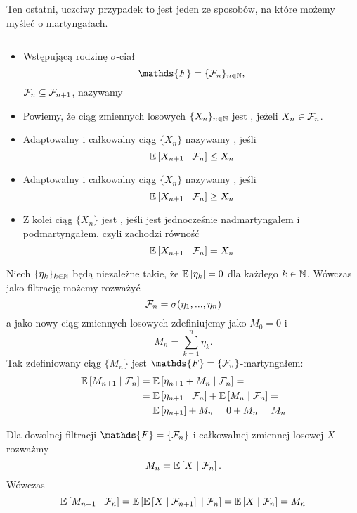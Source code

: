 Ten ostatni, uczciwy przypadek to jest jeden ze sposobów, na które możemy myśleć o martyngałach.

\begin{definition}$ $

  \begin{itemize}
    \item Wstępującą rodzinę $\sigma$-ciał
      $$\mathds{F}=\{\set{F}_n\}_{n\in\N},$$
      $\mathcal{F}_n\subseteq \mathcal{F}_{n+1}$, nazywamy 
    \item Powiemy, że ciąg zmiennych losowych $\{X_n\}_{n\in\operatorname{\mathbb{N}}}$ jest , jeżeli $X_n\in\mathcal{F}_n$.
    \item Adaptowalny i całkowalny ciąg $\{X_n\}$ nazywamy , jeśli
      $$\expected{X_{n+1}}{\set{F}_n}\leq X_n$$
    \item Adaptowalny i całkowalny ciąg $\{X_n\}$ nazywamy , jeśli
      $$\expected{X_{n+1}}{\set{F}_n}\geq X_n$$
    \item Z kolei ciąg $\{X_n\}$ jest , jeśli jest jednocześnie nadmartyngałem i podmartyngałem, czyli zachodzi równość
      $$\expected{X_{n+1}}{\set{F}_n}= X_n$$
  \end{itemize}
\end{definition}

\begin{example}
\item Niech $\{\eta_k\}_{k\in\operatorname{\mathbb{N}}}$ będą niezależne takie, że $\expected{\eta_k}=0$ dla każdego $k\in\operatorname{\mathbb{N}}$. Wówczas jako filtrację możemy rozważyć
  $$\mathcal{F}_n=\sigma(\eta_1,...,\eta_n)$$
  a jako nowy ciąg zmiennych losowych zdefiniujemy jako $M_0=0$ i 
  $$M_n=\sum_{k=1}^n\eta_k.$$
  Tak zdefiniowany ciąg $\{M_n\}$ jest $\mathds{F}=\{\set{F}_n\}$-martyngałem:
  \begin{align*}
    \expected{M_{n+1}}{\set{F}_n}&=\expected{\eta_{n+1}+M_n}{\set{F}_n}=\\
                                 &=\expected{\eta_{n+1}}{\set{F}_n}+\expected{M_n}{\set{F}_n}=\\
                                 &=\expected{\eta_{n+1}}+M_n=0+M_n=M_n
  \end{align*}
\item Dla dowolnej filtracji $\mathds{F}=\{\set{F}_n\}$ i całkowalnej zmiennej losowej $X$ rozważmy
  $$M_n=\expected{X}{\set{F}_n}.$$
  Wówczas
  $$\expected{M_{n+1}}{\set{F}_n}=\expected{\expected{X}{\set{F}_{n+1}}}{\set{F}_n}=\expected{X}{\set{F}_n}=M_n$$
\end{example}

